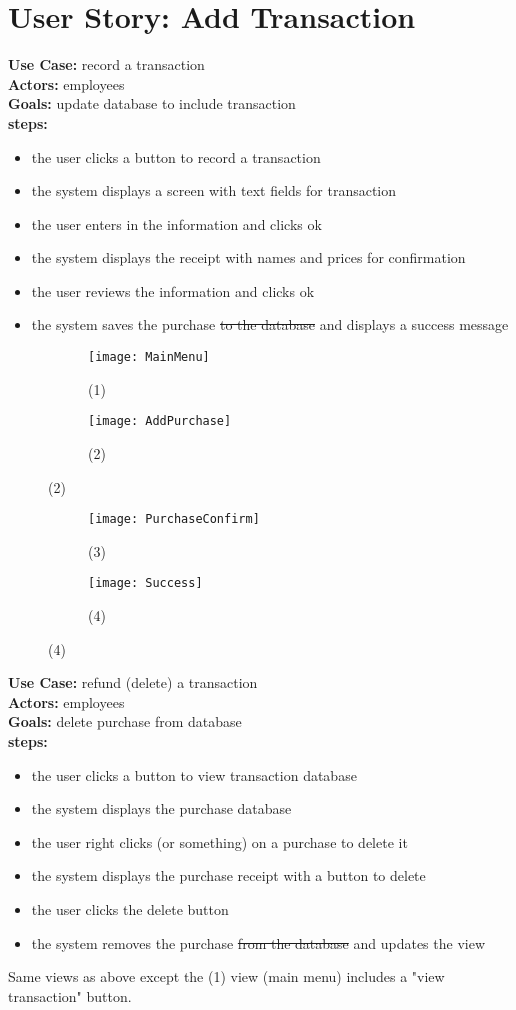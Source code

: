 \documentclass[notitlepage,11pt]{article}
\begin{document}
\section{User Story: Add Transaction}
	\textbf{Use Case:} record a transaction\\
	\textbf{Actors:} employees\\
	\textbf{Goals:} update database to include transaction\\
	\textbf{steps:}
	\begin{itemize}
		\item[(1)] the user clicks a button to record a transaction
		\item[(2)] the system displays a screen with text fields for transaction
		\item the user enters in the information and clicks ok
		\item[(3)] the system displays the receipt with names and prices for confirmation
		\item the user reviews the information and clicks ok
		\item[(4)] the system saves the purchase \sout{to the database} and displays a success message
	\end{itemize}
\begin{figure}[h]
	\begin{subfigure}{.5\textwidth}
	\centering
	\texttt{[image: MainMenu]}
	\caption{(1)}
	\end{subfigure}%
	\begin{subfigure}{.5\textwidth}
	\centering
	\texttt{[image: AddPurchase]}
	\caption{(2)}
	\end{subfigure}
\end{figure}
\begin{figure}[h]
	\begin{subfigure}{.5\textwidth}
	\centering
	\texttt{[image: PurchaseConfirm]}
	\caption{(3)}
	\end{subfigure}%
	\begin{subfigure}{.5\textwidth}
	\centering
	\texttt{[image: Success]}
	\caption{(4)}
	\end{subfigure}
\end{figure}
	\textbf{Use Case:} refund (delete) a transaction\\
	\textbf{Actors:} employees\\
	\textbf{Goals:} delete purchase from database\\
	\textbf{steps:}
	\begin{itemize}
		\item[(1)] the user clicks a button to view transaction database
		\item[(2)] the system displays the purchase database
		\item the user right clicks (or something) on a purchase to delete it
		\item[(3)] the system displays the purchase receipt with a button to delete
		\item the user clicks the delete button
		\item[(2)] the system removes the purchase \sout{from the database} and updates the view
	\end{itemize}
	Same views as above except the (1) view (main menu) includes a "view transaction" button.
\end{document}
